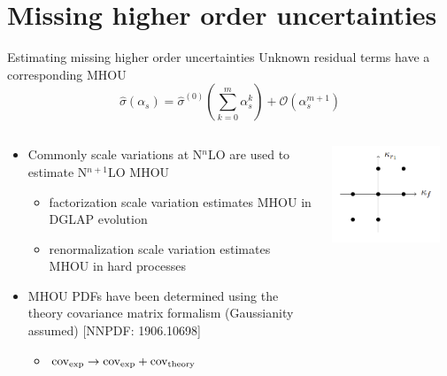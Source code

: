 \documentclass[aspectratio=169, 8pt,t]{beamer}
\begin{document}

\section{Missing higher order uncertainties}

\begin{frame}{Estimating missing higher order uncertainties}
  Unknown residual terms have a corresponding MHOU
  \begin{equation*}
    \hat{\sigma}\left(\alpha_s\right)=\hat{\sigma}^{(0)}\left(\sum_{k=0}^m \alpha_s^k\right)+\mathcal{O}\left(\alpha_s^{m+1}\right)
    \end{equation*}
  \begin{columns}[T]
    \begin{column}{0.49\textwidth}
      \begin{itemize}
        \item Commonly scale variations at N$^n$LO are used to estimate N$^{n+1}$LO MHOU
        \begin{itemize}
          \item factorization scale variation estimates MHOU in DGLAP evolution
          \item renormalization scale variation estimates MHOU in hard processes
        \end{itemize}
        \item MHOU PDFs have been determined using the theory covariance matrix formalism (Gaussianity assumed) {\color{gray}\small [NNPDF: 1906.10698]}
        \begin{itemize}
          \item $\operatorfont{cov_{exp}} \rightarrow \operatorfont{cov_{exp}}+\operatorfont{cov_{theory}}$
        \end{itemize}
      \end{itemize}
    \end{column}
    \begin{column}{0.49\textwidth}
      \vspace*{-2em}
      \includegraphics[width=0.89\textwidth]{figures/7ptsv.png}

\end{column}
\end{columns}
\end{frame}
\end{document}
